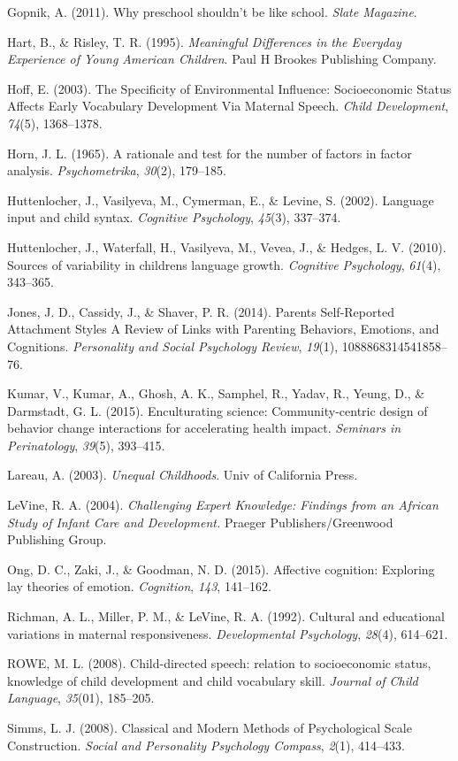 \documentclass[10pt, letterpaper]{article}
\begin{document}
Gopnik, A. (2011). Why preschool shouldn't be like school. \emph{Slate
Magazine}.

Hart, B., \& Risley, T. R. (1995). \emph{Meaningful Differences in the
Everyday Experience of Young American Children}. Paul H Brookes
Publishing Company.

Hoff, E. (2003). The Specificity of Environmental Influence:
Socioeconomic Status Affects Early Vocabulary Development Via Maternal
Speech. \emph{Child Development}, \emph{74}(5), 1368--1378.

Horn, J. L. (1965). A rationale and test for the number of factors in
factor analysis. \emph{Psychometrika}, \emph{30}(2), 179--185.

Huttenlocher, J., Vasilyeva, M., Cymerman, E., \& Levine, S. (2002).
Language input and child syntax. \emph{Cognitive Psychology},
\emph{45}(3), 337--374.

Huttenlocher, J., Waterfall, H., Vasilyeva, M., Vevea, J., \& Hedges, L.
V. (2010). Sources of variability in childrens language growth.
\emph{Cognitive Psychology}, \emph{61}(4), 343--365.

Jones, J. D., Cassidy, J., \& Shaver, P. R. (2014). Parents
Self-Reported Attachment Styles A Review of Links with Parenting
Behaviors, Emotions, and Cognitions. \emph{Personality and Social
Psychology Review}, \emph{19}(1), 1088868314541858--76.

Kumar, V., Kumar, A., Ghosh, A. K., Samphel, R., Yadav, R., Yeung, D.,
\& Darmstadt, G. L. (2015). Enculturating science: Community-centric
design of behavior change interactions for accelerating health impact.
\emph{Seminars in Perinatology}, \emph{39}(5), 393--415.

Lareau, A. (2003). \emph{Unequal Childhoods}. Univ of California Press.

LeVine, R. A. (2004). \emph{Challenging Expert Knowledge: Findings from
an African Study of Infant Care and Development.} Praeger
Publishers/Greenwood Publishing Group.

Ong, D. C., Zaki, J., \& Goodman, N. D. (2015). Affective cognition:
Exploring lay theories of emotion. \emph{Cognition}, \emph{143},
141--162.

Richman, A. L., Miller, P. M., \& LeVine, R. A. (1992). Cultural and
educational variations in maternal responsiveness. \emph{Developmental
Psychology}, \emph{28}(4), 614--621.

ROWE, M. L. (2008). Child-directed speech: relation to socioeconomic
status, knowledge of child development and child vocabulary skill.
\emph{Journal of Child Language}, \emph{35}(01), 185--205.

Simms, L. J. (2008). Classical and Modern Methods of Psychological Scale
Construction. \emph{Social and Personality Psychology Compass},
\emph{2}(1), 414--433.
\end{document}
